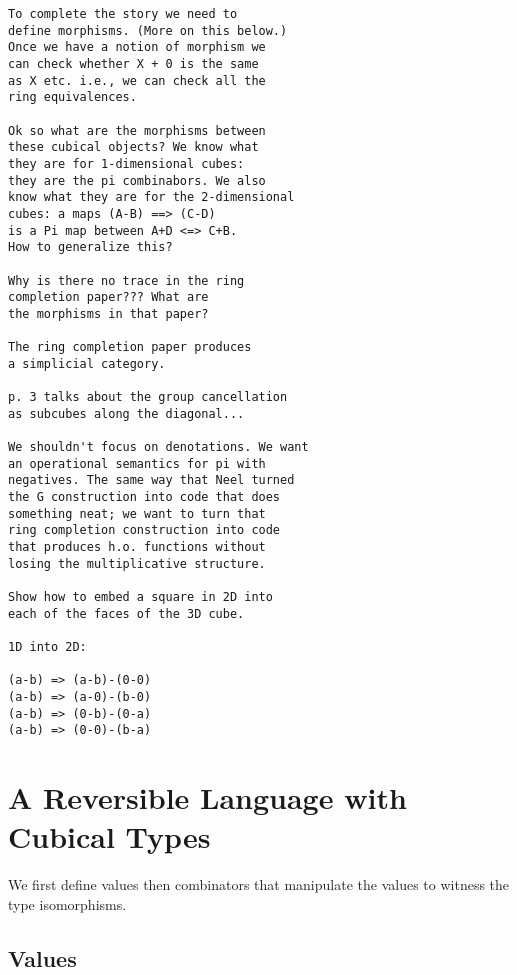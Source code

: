 \documentclass[authoryear,preprint]{sigplanconf}
\begin{document}
\begin{verbatim}
To complete the story we need to 
define morphisms. (More on this below.)
Once we have a notion of morphism we 
can check whether X + 0 is the same
as X etc. i.e., we can check all the 
ring equivalences. 

Ok so what are the morphisms between 
these cubical objects? We know what
they are for 1-dimensional cubes: 
they are the pi combinabors. We also
know what they are for the 2-dimensional 
cubes: a maps (A-B) ==> (C-D) 
is a Pi map between A+D <=> C+B. 
How to generalize this? 

Why is there no trace in the ring 
completion paper??? What are 
the morphisms in that paper?

The ring completion paper produces
a simplicial category.

p. 3 talks about the group cancellation
as subcubes along the diagonal... 

We shouldn't focus on denotations. We want
an operational semantics for pi with 
negatives. The same way that Neel turned
the G construction into code that does
something neat; we want to turn that 
ring completion construction into code
that produces h.o. functions without
losing the multiplicative structure.

Show how to embed a square in 2D into
each of the faces of the 3D cube.

1D into 2D:

(a-b) => (a-b)-(0-0)
(a-b) => (a-0)-(b-0)
(a-b) => (0-b)-(0-a)
(a-b) => (0-0)-(b-a)

\end{verbatim}

\section{A Reversible Language with Cubical Types} 

We first define values then combinators that manipulate the values to witness
the type isomorphisms.

\subsection{Values} 
\end{document}
